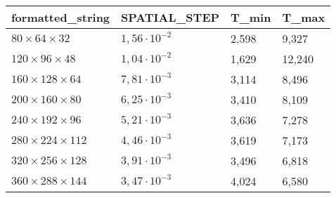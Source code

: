 \begin{tabular}{llll}
\toprule
formatted_string & SPATIAL_STEP & T_min & T_max \\
\midrule
$80 \times 64 \times 32$  & $1,56 \cdot  10^{-2}$ & 2,598 & 9,327 \\
$120 \times 96 \times 48$  & $1,04 \cdot  10^{-2}$ & 1,629 & 12,240 \\
$160 \times 128 \times 64$  & $7,81 \cdot  10^{-3}$ & 3,114 & 8,496 \\
$200 \times 160 \times 80$  & $6,25 \cdot  10^{-3}$ & 3,410 & 8,109 \\
$240 \times 192 \times 96$  & $5,21 \cdot  10^{-3}$ & 3,636 & 7,278 \\
$280 \times 224 \times 112$  & $4,46 \cdot  10^{-3}$ & 3,619 & 7,173 \\
$320 \times 256 \times 128$  & $3,91 \cdot  10^{-3}$ & 3,496 & 6,818 \\
$360 \times 288 \times 144$  & $3,47 \cdot  10^{-3}$ & 4,024 & 6,580 \\
\bottomrule
\end{tabular}
